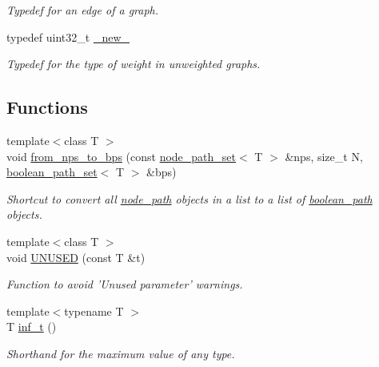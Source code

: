 \begin{DoxyCompactItemize}
\begin{DoxyCompactList}\small\item\em Typedef for an edge of a graph. \end{DoxyCompactList}\item 
typedef uint32\-\_\-t \hyperlink{namespacelgraph_a2836f966c1c36b43da337d8907728ec0}{\-\_\-new\-\_\-}
\begin{DoxyCompactList}\small\item\em Typedef for the type of weight in unweighted graphs. \end{DoxyCompactList}\end{DoxyCompactItemize}
\subsection*{Functions}
\begin{DoxyCompactItemize}
\item 
{\footnotesize template$<$class T $>$ }\\void \hyperlink{namespacelgraph_a22faf23dc44c909b5727c26625637447}{from\-\_\-nps\-\_\-to\-\_\-bps} (const \hyperlink{namespacelgraph_a0570ce57129123d5816913d287f6cc73}{node\-\_\-path\-\_\-set}$<$ T $>$ \&nps, size\-\_\-t N, \hyperlink{namespacelgraph_afad432931ba600ab1628d5c9595986c5}{boolean\-\_\-path\-\_\-set}$<$ T $>$ \&bps)
\begin{DoxyCompactList}\small\item\em Shortcut to convert all \hyperlink{classlgraph_1_1node__path}{node\-\_\-path} objects in a list to a list of \hyperlink{classlgraph_1_1boolean__path}{boolean\-\_\-path} objects. \end{DoxyCompactList}\item 
\hypertarget{namespacelgraph_a9c17e678f030dbd9da486735489e5aef}{{\footnotesize template$<$class T $>$ }\\void \hyperlink{namespacelgraph_a9c17e678f030dbd9da486735489e5aef}{U\-N\-U\-S\-E\-D} (const T \&t)}\label{namespacelgraph_a9c17e678f030dbd9da486735489e5aef}

\begin{DoxyCompactList}\small\item\em Function to avoid 'Unused parameter' warnings. \end{DoxyCompactList}\item 
\hypertarget{namespacelgraph_af736a008e890d631c62cc8c719e966a2}{{\footnotesize template$<$typename T $>$ }\\T \hyperlink{namespacelgraph_af736a008e890d631c62cc8c719e966a2}{inf\-\_\-t} ()}\label{namespacelgraph_af736a008e890d631c62cc8c719e966a2}

\begin{DoxyCompactList}\small\item\em Shorthand for the maximum value of any type. \end{DoxyCompactList}\end{DoxyCompactItemize}
